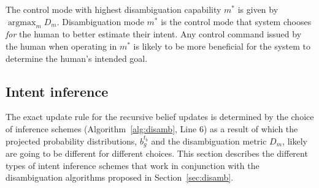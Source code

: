 \documentclass[conference]{IEEEtran}
\DeclareMathOperator*{\argmax}{argmax}
\begin{document}
%		
%		
%		
%		
%		
The control mode with highest disambiguation capability $m^*$ is given by $\argmax_m D_m$. Disambiguation mode $m^*$ is the control mode that system chooses \textit{for} the human to better estimate their intent. Any control command issued by the human when operating in $m^*$ is likely to be more beneficial for the system to determine the human's intended goal. 

\subsection{Intent inference}\label{ssec:inference}
  The exact update rule for the recursive belief updates is determined by the choice of inference schemes (Algorithm~\ref{alg:disamb}, Line 6) as a result of which the projected probability distributions, $b_g^{t_b}$ and the disambiguation metric $D_m$, likely are going to be different for different choices. This section describes the different types of intent inference schemes that work in conjunction with the disambiguation algorithms proposed in Section~\ref{sec:disamb}.
\end{document}
